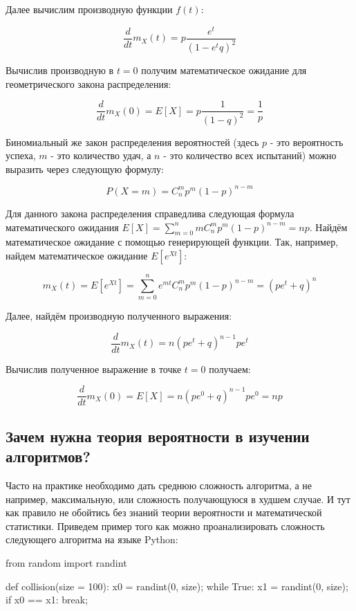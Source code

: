 Далее вычислим производную функции $f(t)$:

$$\frac{d}{dt}m_X(t) = p\frac{e^t}{(1-e^tq)^2}$$

Вычислив производную в $t=0$ получим математическое ожидание для
геометрического закона распределения:

$$\frac{d}{dt}m_X(0) = E[X] = p\frac{1}{(1-q)^2}=\frac{1}{p}$$

Биномиальный же закон распределения вероятностей (здесь $p$ - это вероятность успеха, 
$m$ - это количество удач, а $n$ - это количество всех испытаний) можно выразить через 
следующую формулу:

$$P(X=m)=C^m_np^{m}(1-p)^{n-m}$$

Для данного закона распределения справедлива следующая формула математического 
ожидания $E[X]=\sum_{m=0}^n mC^m_np^{m}(1-p)^{n-m} = np$.  Найдём математическое 
ожидание с помощью генерирующей функции. Так, например, найдем математическое 
ожидание $E[e^{Xt}]$:

$$m_X(t) = E[e^{Xt}] = \sum_{m=0}^n e^{mt}C^m_np^{m}(1-p)^{n-m} = (pe^t+q)^n$$

Далее, найдём производную полученного выражения:

$$\frac{d}{dt}m_X(t) = n(pe^t+q)^{n-1}pe^t$$

Вычислив полученное выражение в точке $t=0$ получаем: 

$$\frac{d}{dt}m_X(0) = E[X] = n(pe^0+q)^{n-1}pe^0 = np$$

\subsection{Зачем нужна теория вероятности в изучении алгоритмов?}

Часто на практике необходимо дать среднюю сложность алгоритма,
а не например, максимальную, или сложность получающуюся в худшем случае. 
И тут как правило не обойтись без знаний теории вероятности и 
математической статистики. Приведем пример того как можно 
проанализировать сложность следующего алгоритма на языке Python:

\begin{python}
from random import randint

def collision(size = 100):
	x0 = randint(0, size);
	while True:
		x1 = randint(0, size);
		if x0 == x1:
			break;
\end{python}

